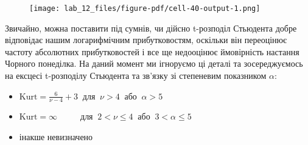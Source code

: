 \documentclass[
  letterpaper,
]{report}
\newenvironment{Shaded}{\begin{snugshade}}{\end{snugshade}}
\newcommand{\CharTok}[1]{\textcolor[rgb]{0.13,0.47,0.30}{#1}}
\newcommand{\DecValTok}[1]{\textcolor[rgb]{0.68,0.00,0.00}{#1}}
\newcommand{\FloatTok}[1]{\textcolor[rgb]{0.68,0.00,0.00}{#1}}
\newcommand{\NormalTok}[1]{\textcolor[rgb]{0.00,0.23,0.31}{#1}}
\newcommand{\OperatorTok}[1]{\textcolor[rgb]{0.37,0.37,0.37}{#1}}
\newcommand{\SpecialCharTok}[1]{\textcolor[rgb]{0.37,0.37,0.37}{#1}}
\newcommand{\SpecialStringTok}[1]{\textcolor[rgb]{0.13,0.47,0.30}{#1}}
\newcommand{\StringTok}[1]{\textcolor[rgb]{0.13,0.47,0.30}{#1}}
\newcommand{\VariableTok}[1]{\textcolor[rgb]{0.07,0.07,0.07}{#1}}
\providecommand{\tightlist}{%
  \setlength{\itemsep}{0pt}\setlength{\parskip}{0pt}}\usepackage{longtable,booktabs,array}
\begin{document}
\begin{Shaded}
\end{Shaded}

\begin{figure}[H]

{\centering \texttt{[image: lab\_12\_files/figure-pdf/cell-40-output-1.png]}

}

\end{figure}

Звичайно, можна поставити під сумнів, чи дійсно t-розподіл Стьюдента
добре відповідає нашим логарифмічним прибутковостям, оскільки він
переоцінює частоту абсолютних прибутковостей і все ще недооцінює
ймовірність настання Чорного понеділка. На даний момент ми ігноруємо ці
деталі та зосереджуємось на ексцесі t-розподілу Стьюдента та зв'язку зі
степеневим показником \(\alpha\):

\begin{itemize}
\tightlist
\item
  \(\text{Kurt} = \frac{6}{\nu-4} + 3~\) для \(~\nu > 4~\) або
  \(~\alpha > 5\)
\item
  \(\text{Kurt} = \infty~~~~~~~~~~\,\) для \(~2 < \nu \leq 4~\) або
  \(~3 < \alpha \leq 5\)
\item
  інакше невизначено
\end{itemize}
\end{document}
